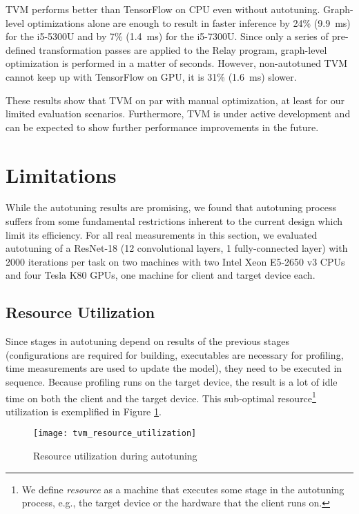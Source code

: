 TVM performs better than TensorFlow on CPU even without autotuning. Graph-level optimizations alone are enough to result in faster inference by 24\% (\SI{9.9}{\milli\second}) for the i5-5300U and by 7\% (\SI{1.4}{\milli\second}) for the i5-7300U. Since only a series of pre-defined transformation passes are applied to the Relay program, graph-level optimization is performed in a matter of seconds. However, non-autotuned TVM cannot keep up with TensorFlow on GPU, it is 31\% (\SI{1.6}{\milli\second}) slower.

These results show that TVM on par with manual optimization, at least for our limited evaluation scenarios. Furthermore, TVM is under active development and can be expected to show further performance improvements in the future.

\section{Limitations}
While the autotuning results are promising, we found that autotuning process suffers from some fundamental restrictions inherent to the current design which limit its efficiency. For all real measurements in this section, we evaluated autotuning of a ResNet-18 (12 convolutional layers, 1 fully-connected layer) with 2000 iterations per task on two machines with two Intel Xeon E5-2650 v3 CPUs and four Tesla K80 GPUs, one machine for client and target device each.

\subsection{Resource Utilization}
Since stages in autotuning depend on results of the previous stages (configurations are required for building, executables are necessary for profiling, time measurements are used to update the model), they need to be executed in sequence. Because profiling runs on the target device, the result is a lot of idle time on both the client and the target device. This sub-optimal resource\footnote{We define \textit{resource} as a machine that executes some stage in the autotuning process, e.g., the target device or the hardware that the client runs on.} utilization is exemplified in Figure \ref{fig:tvm-res-util}.

\begin{figure}
	\centering
	\texttt{[image: tvm\_resource\_utilization]}%
	\caption{Resource utilization during autotuning}
	\label{fig:tvm-res-util}
\end{figure}

